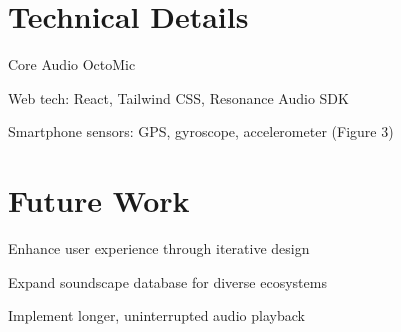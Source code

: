\documentclass[a4paper]{article}
\begin{document}
{\begin{multicols}{2}
        \section{Technical Details}
        \begin{compactitem}
            \item Core Audio OctoMic
            \item Web tech: React, Tailwind CSS, Resonance Audio SDK
            \item Smartphone sensors: GPS, gyroscope, accelerometer (Figure 3)
        \end{compactitem}

        \section{Future Work}
        \begin{compactitem}
            \item Enhance user experience through iterative design
            \item Expand soundscape database for diverse ecosystems
            \item Implement longer, uninterrupted audio playback
        \end{compactitem}
    \end{multicols}
}
\end{document}

